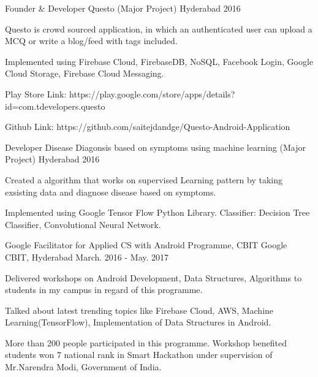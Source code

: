 \begin{cventries}
  \cventry
    {Founder \& Developer} %
    {Questo (Major Project)} %
    {Hyderabad} %
    {2016} %
    {
      \begin{cvitems} %
        \item {Questo is crowd sourced application, in which an authenticated user can upload a MCQ or write a blog/feed with tags included.}
        \item {Implemented  using Firebase Cloud, FirebaseDB, NoSQL, Facebook Login, Google Cloud Storage, Firebase Cloud Messaging.}
        \item {Play Store Link: https://play.google.com/store/apps/details?id=com.tdevelopers.questo
       \item Github Link: https://github.com/saitejdandge/Questo-Android-Application}
      \end{cvitems}
    }

  \cventry
    {Developer} %
    {Disease Diagonsis based on symptoms using machine learning (Major Project)} %
    {Hyderabad} %
    {2016} %
    {
      \begin{cvitems} %
        \item {Created a algorithm that works on supervised Learning pattern by taking exsisting data and diagnose disease based on symptoms.}
        \item {Implemented  using Google Tensor Flow Python Library.
        Classifier: Decision Tree Classifier, Convolutional Neural Network.}
      \end{cvitems}
    }

  \cventry
    {Google Facilitator for Applied CS with Android Programme, CBIT} %
    {Google} %
    {CBIT, Hyderabad} %
    {March. 2016 - May. 2017} %
    {
      \begin{cvitems} %
        \item {Delivered workshops on Android Development, Data Structures, Algorithms to students in my campus in regard of this programme.}
        \item {Talked about latest trending topics like Firebase Cloud, AWS, Machine Learning(TensorFlow), Implementation of Data Structures in Android.}
        \item {More than 200 people participated in this programme. Workshop benefited students won 7 national rank in Smart Hackathon under supervision of Mr.Narendra Modi, Government of India.}
      \end{cvitems}
    }



\end{cventries}
